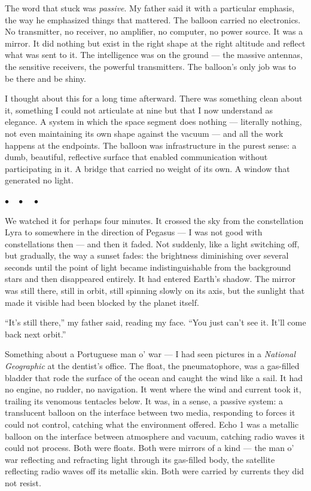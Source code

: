\documentclass[12pt, letterpaper]{article}
\begin{document}
The word that stuck was \emph{passive}. My father said it with a particular emphasis, the way he emphasized things that mattered. The balloon carried no electronics. No transmitter, no receiver, no amplifier, no computer, no power source. It was a mirror. It did nothing but exist in the right shape at the right altitude and reflect what was sent to it. The intelligence was on the ground --- the massive antennas, the sensitive receivers, the powerful transmitters. The balloon's only job was to be there and be shiny.

I thought about this for a long time afterward. There was something clean about it, something I could not articulate at nine but that I now understand as elegance. A system in which the space segment does nothing --- literally nothing, not even maintaining its own shape against the vacuum --- and all the work happens at the endpoints. The balloon was infrastructure in the purest sense: a dumb, beautiful, reflective surface that enabled communication without participating in it. A bridge that carried no weight of its own. A window that generated no light.

\begin{center}
$\bullet\quad\bullet\quad\bullet$
\end{center}

We watched it for perhaps four minutes. It crossed the sky from the constellation Lyra to somewhere in the direction of Pegasus --- I was not good with constellations then --- and then it faded. Not suddenly, like a light switching off, but gradually, the way a sunset fades: the brightness diminishing over several seconds until the point of light became indistinguishable from the background stars and then disappeared entirely. It had entered Earth's shadow. The mirror was still there, still in orbit, still spinning slowly on its axis, but the sunlight that made it visible had been blocked by the planet itself.

``It's still there,'' my father said, reading my face. ``You just can't see it. It'll come back next orbit.''

Something about a Portuguese man o' war --- I had seen pictures in a \emph{National Geographic} at the dentist's office. The float, the pneumatophore, was a gas-filled bladder that rode the surface of the ocean and caught the wind like a sail. It had no engine, no rudder, no navigation. It went where the wind and current took it, trailing its venomous tentacles below. It was, in a sense, a passive system: a translucent balloon on the interface between two media, responding to forces it could not control, catching what the environment offered. Echo 1 was a metallic balloon on the interface between atmosphere and vacuum, catching radio waves it could not process. Both were floats. Both were mirrors of a kind --- the man o' war reflecting and refracting light through its gas-filled body, the satellite reflecting radio waves off its metallic skin. Both were carried by currents they did not resist.
\end{document}
